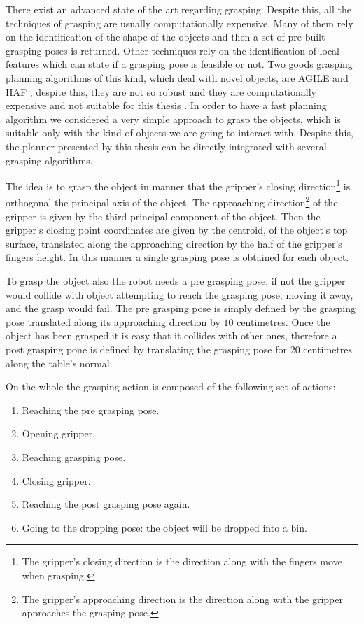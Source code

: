 There exist an advanced state of the art regarding grasping. Despite this, all the techniques of grasping are usually computationally expensive. Many of them rely on the identification of the shape of the objects and then a set of pre-built grasping poses is returned\citep{brook2011collaborative}. Other techniques rely on the identification of local features which can state if a grasping pose is feasible or not. Two goods grasping planning algorithms of this kind, which deal with novel objects, are AGILE \citep{AGILE} and HAF \citep{haf}, despite this, they are not so robust and they are computationally expensive and not suitable for this thesis \citep{covallero}. In order to have a fast planning algorithm we considered a very simple approach to grasp the objects, which is suitable only with the kind of objects we are going to interact with. Despite this, the planner presented by this thesis can be directly integrated with several grasping algorithms. 

The idea is to grasp the object in manner that the gripper's closing direction\footnote{The gripper's closing direction is the direction along with the fingers move when grasping.} is orthogonal the principal axis of the object. The approaching direction\footnote{The gripper's approaching direction is the direction along with the gripper approaches the grasping pose.} of the gripper is given by the third principal component of the object. Then the gripper's closing point coordinates are given by the centroid, of the object's top surface, translated along the approaching direction by the half of the gripper's fingers height.
In this manner a single grasping pose is obtained for each object. 

To grasp the object also the robot needs a pre grasping pose, if not the gripper would collide with object attempting to reach the grasping pose, moving it away, and the grasp would fail. The pre grasping pose is simply defined by the grasping pose translated along its approaching direction by $10$ centimetres.
Once the object has been grasped it is easy that it collides with other ones, therefore a post grasping pone is defined by translating the grasping pose for $20$ centimetres along the table's normal.

On the whole the grasping action is composed of the following set of actions: 
\begin{enumerate}
\item Reaching the pre grasping pose.
\item Opening gripper.
\item Reaching grasping pose.
\item Closing gripper.
\item Reaching the post grasping pose again.
\item Going to the dropping pose: the object will be dropped into a bin.
\end{enumerate}


